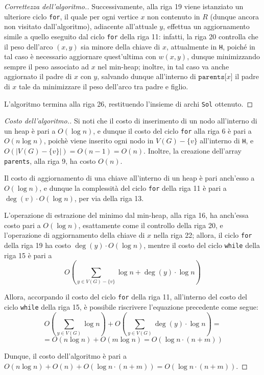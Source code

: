 \documentclass[a4paper, 12pt]{report}
\begin{document}
\begin{proof}[Correttezza dell'algoritmo.]
        Successivamente, alla riga 19 viene istanziato un ulteriore ciclo \texttt{for}, il quale per ogni vertice $x$ non contenuto in $R$ (dunque ancora non visitato dall'algoritmo), adiacente all'attuale $y$, effettua un aggiornamento simile a quello eseguito dal ciclo \texttt{for} della riga 11: infatti, la riga 20 controlla che il peso dell'arco $(x, y)$ sia minore della chiave di $x$, attualmente in \texttt{H}, poiché in tal caso è necessario aggiornare quest'ultima con $w(x, y)$, dunque minimizzando sempre il peso associato ad $x$ nel min-heap; inoltre, in tal caso va anche aggiornato il padre di $x$ con $y$, salvando dunque all'interno di $\texttt{parents[}x\texttt{]}$ il padre di $x$ tale da minimizzare il peso dell'arco tra padre e figlio.

        L'algoritmo termina alla riga 26, restituendo l'insieme di archi \texttt{Sol} ottenuto.
    \end{proof}

    \begin{proof}[Costo dell'algoritmo.]
        Si noti che il costo di inserimento di un nodo all'interno di un heap è pari a $O(\log n)$, e dunque il costo del ciclo \texttt{for} alla riga 6 è pari a $O (n \log n)$, poichè viene inserito ogni nodo in $V(G) - \{v\}$ all'interno di \texttt{H}, e $O(|V(G) - \{v\}|) = O(n - 1) = O(n)$. Inoltre, la creazione dell'array \texttt{parents}, alla riga 9, ha costo $O(n)$.

        Il costo di aggiornamento di una chiave all'interno di un heap è pari anch'esso a $O(\log n)$, e dunque la complessità del ciclo \texttt{for} della riga 11 è pari a $\deg(v) \cdot O(\log n)$, per via della riga 13.

        L'operazione di estrazione del minimo dal min-heap, alla riga 16, ha anch'essa costo pari a $O(\log n)$, esattamente come il controllo della riga 20, e l'operazione di aggiornamento della chiave di $x$ nella riga 22; allora, il ciclo \texttt{for} della riga 19 ha costo $\deg(y) \cdot O(\log n)$, mentre il costo del ciclo \texttt{while} della riga 15 è pari a $$\displaystyle O\left(\sum_{y \in V(G) - \{v\}}{\log n + \deg(y) \cdot \log n}\right)$$

        Allora, accorpando il costo del ciclo \texttt{for} della riga 11, all'interno del costo del ciclo \texttt{while} della riga 15, è possibile riscrivere l'equazione precedente come segue: $$\displaystyle O\left(\sum_{y \in V(G)} {\log n}\right) + O \left(\sum_{y \in V(G)}{\deg(y) \cdot \log n}\right) = $$ $$= O(n \log n ) + O(m \log n) = O(\log n \cdot( n + m))$$

        Dunque, il costo dell'algoritmo è pari a $O(n \log n) + O(n) + O(\log n \cdot (n + m)) = O(\log n \cdot (n + m))$.
    \end{proof}
\end{document}
